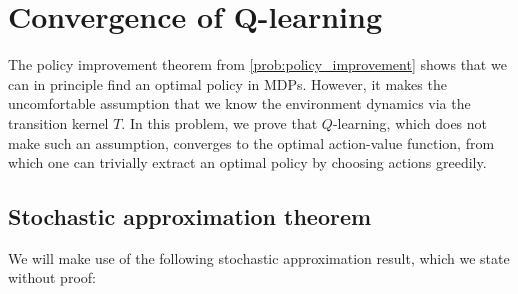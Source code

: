 \documentclass[11pt]{article}
\begin{document}


\section{Convergence of Q-learning}\label{prob:q_learning}

The policy improvement theorem from \cref{prob:policy_improvement} shows that we can in principle find an optimal policy in MDPs. However, it makes the uncomfortable assumption that we know the environment dynamics via the transition kernel $T$. In this problem, we prove that $Q$-learning, which does not make such an assumption, converges to the optimal action-value function, from which one can trivially extract an optimal policy by choosing actions greedily.

\subsection*{Stochastic approximation theorem}

We will make use of the following stochastic approximation result, which we state without proof:
\end{document}

